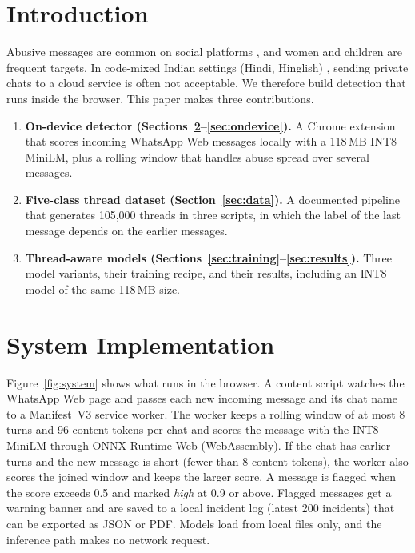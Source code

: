 \documentclass[sigconf,9pt]{acmart}
\begin{document}
\section{Introduction}
Abusive messages are common on social platforms \cite{Mathew_Saha_Yimam_Biemann_Goyal_Mukherjee_2021}, and women and children are frequent targets. In code-mixed Indian settings (Hindi, Hinglish) \cite{NEURIPS2022_a7c4163b}, sending private chats to a cloud service is often not acceptable. We therefore build detection that runs inside the browser. This paper makes three contributions.

\begin{enumerate}
    \item \textbf{On-device detector (Sections~\ref{sec:system}--\ref{sec:ondevice}).} A Chrome extension that scores incoming WhatsApp Web messages locally with a 118\,MB INT8 MiniLM, plus a rolling window that handles abuse spread over several messages.
    \item \textbf{Five-class thread dataset (Section~\ref{sec:data}).} A documented pipeline that generates 105{,}000 threads in three scripts, in which the label of the last message depends on the earlier messages.
    \item \textbf{Thread-aware models (Sections~\ref{sec:training}--\ref{sec:results}).} Three model variants, their training recipe, and their results, including an INT8 model of the same 118\,MB size.
\end{enumerate}

\section{System Implementation}\label{sec:system}
Figure~\ref{fig:system} shows what runs in the browser. A content script watches the WhatsApp Web page and passes each new incoming message and its chat name to a Manifest~V3 service worker. The worker keeps a rolling window of at most 8 turns and 96 content tokens per chat and scores the message with the INT8 MiniLM through ONNX Runtime Web (WebAssembly). If the chat has earlier turns and the new message is short (fewer than 8 content tokens), the worker also scores the joined window and keeps the larger score. A message is flagged when the score exceeds 0.5 and marked \textit{high} at 0.9 or above. Flagged messages get a warning banner and are saved to a local incident log (latest 200 incidents) that can be exported as JSON or PDF. Models load from local files only, and the inference path makes no network request.
\end{document}
